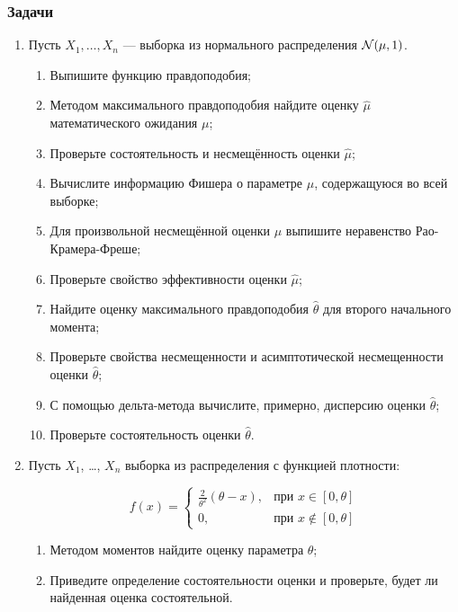 \subsubsection*{Задачи}

\begin{enumerate}[resume]
\item Пусть $X_{1}, \ldots, X_{n}$ — выборка из нормального распределения $\mathcal{N}(\mu,1)$.
\begin{enumerate}
\item Выпишите функцию правдоподобия;
\item Методом максимального правдоподобия найдите оценку $\hat{\mu}$ математического
ожидания $\mu$;
\item Проверьте состоятельность и несмещённость оценки $\hat{\mu}$;
\item Вычислите информацию Фишера о параметре $\mu$, содержащуюся во всей выборке;
\item Для произвольной несмещённой оценки $\mu$ выпишите неравенство Рао-Крамера-Фреше;
\item Проверьте свойство эффективности оценки $\hat{\mu}$;
\item Найдите оценку максимального правдоподобия $\hat{\theta}$ для второго начального
момента;
\item Проверьте свойства несмещенности и асимптотической несмещенности оценки $\hat{\theta}$;
\item С помощью дельта-метода вычислите, примерно, дисперсию оценки $\hat{\theta}$;
\item Проверьте состоятельность оценки $\hat{\theta}$.
\end{enumerate}

 \item Пусть $X_{1}$, \ldots, $X_{n}$ выборка из распределения с функцией плотности:

\[
f(x)=\begin{cases}
\frac{2}{\theta^2}(\theta-x),&\text{при }x\in[0,\theta]\\
0,&\text{при }x\notin[0,\theta]
\end{cases}
\]

\begin{enumerate}
\item Методом моментов найдите оценку параметра $\theta$;
\item Приведите определение состоятельности оценки и проверьте, будет ли найденная
оценка состоятельной.
\end{enumerate}


\end{enumerate}
